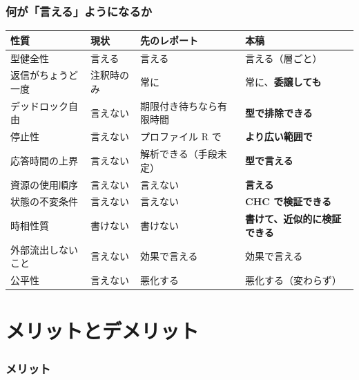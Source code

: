 \documentclass[11pt,a4paper]{ltjsarticle}
\theoremstyle{remark}
\begin{document}
\section{何が「言える」ようになるか}

\begin{center}
\small
\begin{tabular}{@{}llll@{}}
\toprule
性質 & 現状 & 先のレポート & 本稿 \\
\midrule
型健全性 & 言える & 言える & 言える（層ごと） \\
返信がちょうど一度 & 注釈時のみ & 常に & 常に、\textbf{委譲しても} \\
デッドロック自由 & 言えない & 期限付き待ちなら有限時間 &
  \textbf{型で排除できる} \\
停止性 & 言えない & プロファイル R で & \textbf{より広い範囲で} \\
応答時間の上界 & 言えない & 解析できる（手段未定）&
  \textbf{型で言える} \\
資源の使用順序 & 言えない & 言えない & \textbf{言える} \\
状態の不変条件 & 言えない & 言えない & \textbf{CHC で検証できる} \\
時相性質 & 書けない & 書けない & \textbf{書けて、近似的に検証できる} \\
外部流出しないこと & 言えない & 効果で言える & 効果で言える \\
公平性 & 言えない & 悪化する & 悪化する（変わらず）\\
\bottomrule
\end{tabular}
\end{center}

\part{メリットとデメリット}

\section{メリット}
\end{document}
